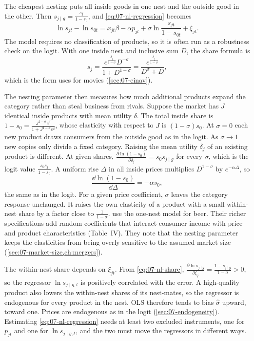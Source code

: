 The cheapest nesting puts all inside goods in one nest and the outside good in the other. Then
$s_{j \mid g} = \frac{s_j}{1 - s_0}$, and \eqref{eq:07-nl-regression} becomes
\begin{equation}\label{eq:07-nl-onenest}
\ln s_{jt} - \ln s_{0t} = x_{jt}\beta - \alpha p_{jt} + \sigma\ln\frac{s_{jt}}{1 - s_{0t}} + \xi_{jt} .
\end{equation}
The model requires no classification of products, so it is often run as a robustness check on the logit. With one
inside nest and inclusive sum $D$, the share formula is
\begin{equation*}
s_j = \frac{e^{\frac{\delta_j}{1-\sigma}}D^{-\sigma}}{1 + D^{1-\sigma}} = \frac{e^{\frac{\delta_j}{1-\sigma}}}{D^{\sigma} + D} ,
\end{equation*}
which is the form \citet[eq.~3]{Einav2007} uses for movies (\cref{sec:07-einav}).

The nesting parameter then measures how much additional products expand the category rather than steal
business from rivals. Suppose the market has $J$ identical inside products with mean utility $\delta$. The total
inside share is $1 - s_0 = \frac{J^{1-\sigma}e^{\delta}}{1 + J^{1-\sigma}e^{\delta}}$, whose elasticity with respect to $J$
is $(1-\sigma)s_0$. At $\sigma = 0$ each new product draws consumers from the outside good as in the logit. As
$\sigma \to 1$ new copies only divide a fixed category. Raising the mean utility $\delta_j$ of an existing product is different. At given shares,
$\frac{\partial\ln(1 - s_0)}{\partial\delta_j} = s_0 s_{j \mid g}$ for every $\sigma$, which is the logit value
$\frac{s_0 s_j}{1 - s_0}$. A uniform rise $\Delta$ in all inside prices multiplies
$D^{1-\sigma}$ by $e^{-\alpha\Delta}$, so
\begin{equation*}
\frac{\dd\ln(1 - s_0)}{\dd\Delta} = -\alpha s_0 ,
\end{equation*}
the same as in the logit. For a given price coefficient, $\sigma$ leaves the category response unchanged. It raises
the own elasticity of a product with a small within-nest share by a factor close to $\frac{1}{1-\sigma}$.
 use the one-nest model for beer. Their richer specifications add random
coefficients that interact consumer income with price and product characteristics (Table~IV). They note that the nesting parameter keeps the elasticities from being overly sensitive to the
assumed market size (\cref{sec:07-market-size,ch:mergers}).

The within-nest share depends on $\xi_{jt}$. From \eqref{eq:07-nl-share},
$\frac{\partial\ln s_{j \mid g}}{\partial\xi_j} = \frac{1 - s_{j \mid g}}{1-\sigma} > 0$, so the regressor
$\ln s_{j \mid g, t}$ is positively correlated with the error. A high-quality product also lowers the within-nest
shares of its nest-mates, so the regressor is endogenous for every product in the nest. OLS therefore tends to
bias $\hat\sigma$ upward, toward one. Prices are endogenous as in the logit (\cref{sec:07-endogeneity}). Estimating
\eqref{eq:07-nl-regression} needs at least two excluded instruments, one for $p_{jt}$ and one for
$\ln s_{j \mid g, t}$, and the two must move the regressors in different ways.

